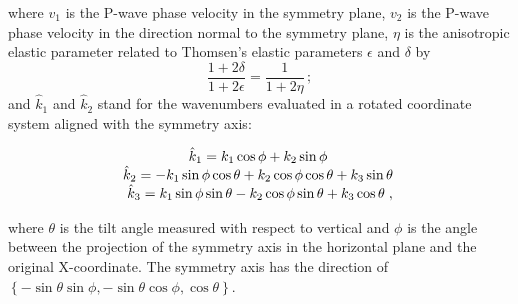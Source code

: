 where $v_1$ is the P-wave phase velocity in the symmetry plane, 
$v_2$ is the P-wave phase velocity in the direction normal to the symmetry plane, 
$\eta$ is the anisotropic elastic parameter \cite[]{alkhalifah} related to Thomsen's elastic parameters $\epsilon$ and $\delta$ \cite[]{thomsen} by
$$\frac{1+2\delta}{1+2\epsilon}=\frac{1}{1+2\eta}\,;$$
and $\hat{k}_1$ and $\hat{k}_2$ stand for the wavenumbers evaluated in a rotated coordinate system aligned with the symmetry axis:

\begin{equation}
\label{eq:wavenumber}
\begin{array}{*{20}c}
\hat{k}_1=k_1\cos{\phi}+k_2\sin{\phi}\;\\ 
\hat{k}_2=-k_1\sin{\phi}\cos{\theta}+k_2\cos{\phi}\cos{\theta}+k_3\sin{\theta}\;\\ 
\hat{k}_3=k_1\sin{\phi}\sin{\theta}-k_2\cos{\phi}\sin{\theta}+k_3\cos{\theta}\;,\\ 
 \end{array}
\end{equation}

where $\theta$ is the tilt angle measured with respect to vertical and $\phi$ is the angle between the projection of the symmetry axis in the horizontal plane and the original X-coordinate. The symmetry axis has the direction of $\left\{-\sin\theta\sin\phi,-\sin\theta\cos\phi,\cos\theta\right\}$. \\


